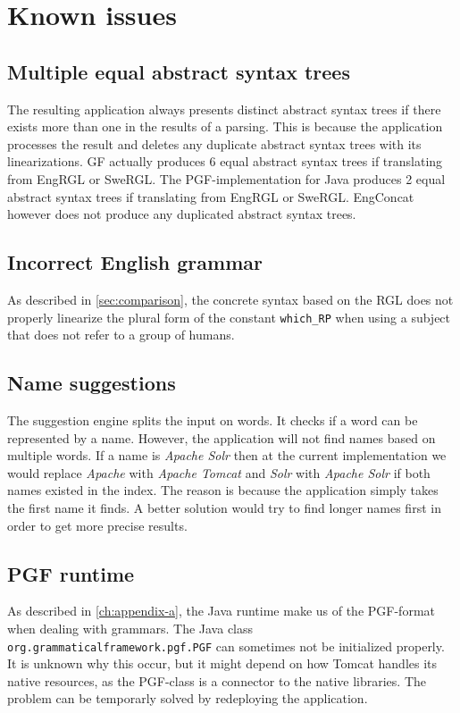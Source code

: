 \section{Known issues}\label{sec:known-issues}

\subsection*{Multiple equal abstract syntax trees}
The resulting application always presents distinct abstract syntax trees if there exists more than one in the results of a parsing. This is because the application processes the result and deletes any duplicate abstract syntax trees with its linearizations. GF actually produces 6 equal abstract syntax trees if translating from EngRGL or SweRGL. The PGF-implementation for Java produces 2 equal abstract syntax trees if translating from EngRGL or SweRGL. EngConcat however does not produce any duplicated abstract syntax trees.

\subsection*{Incorrect English grammar}
As described in \autoref{sec:comparison}, the concrete syntax based on the RGL does not properly linearize the plural form of the constant \texttt{which\_RP} when using a subject that does not refer to a group of humans.

\subsection*{Name suggestions}
The suggestion engine splits the input on words. It checks if a word can be represented by a name. However, the application will not find names based on multiple words. If a name is \emph{Apache Solr} then at the current implementation we would replace \emph{Apache} with \emph{Apache Tomcat} and \emph{Solr} with \emph{Apache Solr} if both names existed in the index. The reason is because the application simply takes the first name it finds. A better solution would try to find longer names first in order to get more precise results.

\subsection*{PGF runtime}
As described in \autoref{ch:appendix-a}, the Java runtime make us of the PGF-format when dealing with grammars. The Java class \texttt{org.grammaticalframework.pgf.PGF} can sometimes not be initialized properly. It is unknown why this occur, but it might depend on how Tomcat handles its native resources, as the PGF-class is a connector to the native libraries. The problem can be temporarly solved by redeploying the application.

